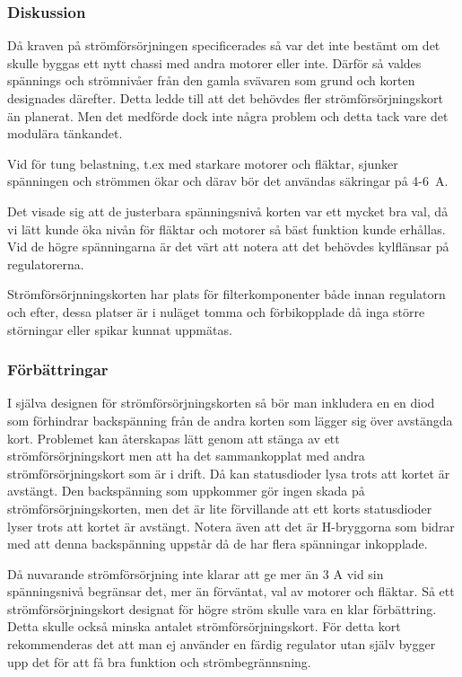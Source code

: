 \subsubsection{Diskussion}
Då kraven på strömförsörjningen specificerades så var det inte bestämt om det
skulle byggas ett nytt chassi med andra motorer eller inte. Därför så valdes
spännings och strömnivåer från den gamla svävaren som grund och korten
designades därefter. Detta ledde till att det behövdes fler
strömförsörjningskort än planerat. Men det medförde dock inte några problem och
detta tack vare det modulära tänkandet.

Vid för tung belastning, t.ex med starkare motorer och fläktar,
sjunker spänningen och strömmen ökar och därav bör det användas säkringar
på 4-6~A.

Det visade sig att de justerbara spänningsnivå korten var ett mycket bra val, då
vi lätt kunde öka nivån för fläktar och motorer så bäst funktion kunde erhållas.
Vid de högre spänningarna är det värt att notera att det behövdes kylflänsar
på regulatorerna.

Strömförsörjnningskorten har plats för filterkomponenter både innan regulatorn
och efter, dessa platser är i nuläget tomma och förbikopplade då inga större
störningar eller spikar kunnat uppmätas.

\subsubsection{Förbättringar}
I själva designen för strömförsörjningskorten så bör man inkludera en en
diod som förhindrar backspänning från de andra korten som lägger sig
över avstängda kort. Problemet kan återskapas lätt genom att stänga av ett
strömförsörjningskort men att ha det sammankopplat med andra
strömförsörjningskort som är i drift. Då kan statusdioder lysa trots att kortet
är avstängt. Den backspänning som uppkommer gör ingen skada på
strömförsörjningskorten, men det är lite förvillande att ett korts statusdioder
lyser trots att kortet är avstängt. Notera även  att det är H-bryggorna som
bidrar med att denna backspänning uppstår då de har flera spänningar inkopplade.

Då nuvarande strömförsörjning inte klarar att ge mer än 3 A vid sin
spänningsnivå begränsar det, mer än förväntat, val av motorer och fläktar. Så
ett strömförsörjningskort designat för högre ström skulle vara en klar
förbättring. Detta skulle också minska antalet strömförsörjningskort.
För detta kort rekommenderas det att man ej använder en färdig regulator utan
själv bygger upp det för att få bra funktion och strömbegrännsning.

